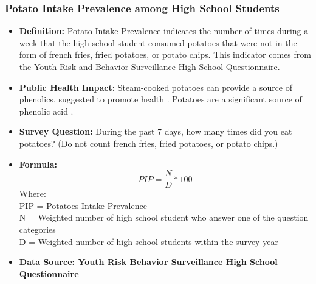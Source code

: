 \documentclass[12pt,letterpaper]{report}
\begin{document}
		\subsubsection{Potato Intake Prevalence among High School Students} 
	\begin{itemize}
		\item \textbf{Definition:} Potato Intake Prevalence indicates the number of times during a week that the high school student consumed potatoes that were not in the form of french fries, fried potatoes, or potato chips.  This indicator comes from the Youth Risk and Behavior Surveillance High School Questionnaire.
		\item \textbf{Public Health Impact:} Steam-cooked potatoes can provide a source of phenolics, suggested to promote health \cite{tudela2002induction}. Potatoes are a significant source of phenolic acid \cite{mattila2007phenolic}.
		\item \textbf{Survey Question:} During the past 7 days, how many times did you eat potatoes? (Do not count french fries, fried potatoes, or potato chips.)

		\item \textbf{Formula:} 
			\begin{equation}
				PIP = \frac{N}{D} *100
			\end{equation}
Where: \\
			PIP = Potatoes Intake Prevalence\\
			
			N = Weighted number of high school student who answer one of the question categories\\
			
			D = Weighted number of high school students within the survey year \\
			
		\item \textbf{Data Source: Youth Risk Behavior Surveillance High School Questionnaire}
	\end{itemize}
	
\end{document}
